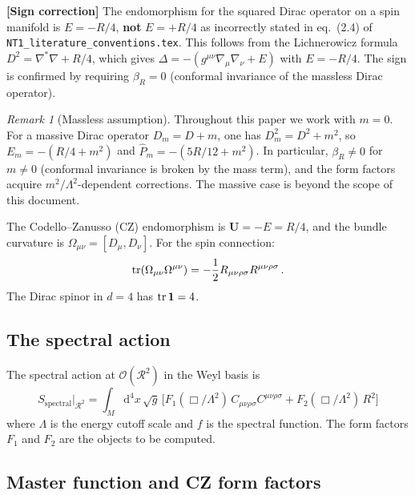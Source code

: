 \documentclass[11pt,a4paper]{article}
\newcommand{\Id}{\mathbf{1}}
\newcommand{\Rsq}{R_{\mu\nu\rho\sigma}R^{\mu\nu\rho\sigma}}
\newcommand{\Weylsq}{C_{\mu\nu\rho\sigma}C^{\mu\nu\rho\sigma}}
\renewcommand{\dd}{\mathrm{d}}
\theoremstyle{definition}
\theoremstyle{remark}
\newtheorem{remark}[theorem]{Remark}
\newcommand{\signcorrection}[1]{%
  \par\noindent\colorbox{red!10}{%
    \parbox{\dimexpr\linewidth-2\fboxsep}{%
      \textcolor{red!50!black}{\textbf{[Sign correction]}}
      \textcolor{red!50!black}{#1}%
    }%
  }\par%
}
\begin{document}
\signcorrection{The endomorphism for the squared Dirac operator on a
  spin manifold is $E = -R/4$, \textbf{not} $E = +R/4$ as incorrectly
  stated in eq.~(2.4) of \texttt{NT1\_literature\_conventions.tex}.
  This follows from the Lichnerowicz formula $D^2 = \nabla^*\nabla + R/4$,
  which gives $\Delta = -(g^{\mu\nu}\nabla_\mu\nabla_\nu + E)$ with
  $E = -R/4$.  The sign is confirmed by requiring $\beta_R = 0$
  (conformal invariance of the massless Dirac operator).}

\begin{remark}[Massless assumption]
\label{rem:massless}
Throughout this paper we work with $m = 0$.  For a massive Dirac
operator $D_m = D + m$, one has $D_m^2 = D^2 + m^2$, so
$E_m = -(R/4 + m^2)$ and $\hat{P}_m = -(5R/12 + m^2)$.  In particular,
$\beta_R \neq 0$ for $m \neq 0$ (conformal invariance is broken by
the mass term), and the form factors acquire $m^2/\Lambda^2$-dependent
corrections.  The massive case is beyond the scope of this document.
\end{remark}

The Codello--Zanusso (CZ) endomorphism is
$\mathbf{U} = -E = R/4$, and the bundle curvature is
$\Omega_{\mu\nu} = [D_\mu, D_\nu]$.  For the spin connection:
\begin{equation}
  \tr(\Omega_{\mu\nu}\Omega^{\mu\nu}) = -\frac{1}{2}\Rsq\,.
  \label{eq:omega-sq-trace}
\end{equation}
The Dirac spinor in $d=4$ has $\tr\Id = 4$.


\subsection{The spectral action}

The spectral action at $\mathcal{O}(\mathcal{R}^2)$ in the Weyl basis is
\begin{equation}
  \boxed{
  S_{\text{spectral}}\Big|_{\mathcal{R}^2}
  = \int_M \dd^4x\,\sqrt{g}\,\bigl[
    F_1(\Box/\Lambda^2)\,\Weylsq
    + F_2(\Box/\Lambda^2)\,R^2
  \bigr]
  }
  \label{eq:spectral-action}
\end{equation}
where $\Lambda$ is the energy cutoff scale and $f$ is the spectral
function.  The form factors $F_1$ and $F_2$ are the objects to be
computed.


\subsection{Master function and CZ form factors}
\end{document}
